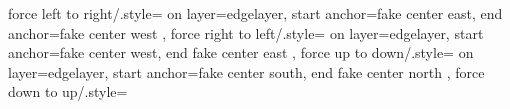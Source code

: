 {{    %
    force left to right/.style={
      on layer=edgelayer,
      start anchor=fake center east,
      end anchor=fake center west
    },
    force right to left/.style={
      on layer=edgelayer,
      start anchor=fake center west,
      end fake center east
    },
    force up to down/.style={
      on layer=edgelayer,
      start anchor=fake center south,
      end fake center north
    },
    force down to up/.style={
}}}
